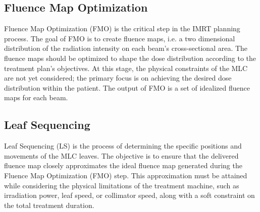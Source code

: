 \subsection[FMO]{Fluence Map Optimization}
Fluence Map Optimization (FMO) is the critical step in the IMRT planning process.
The goal of FMO is to create fluence maps, i.e. a two dimensional distribution of the radiation intensity on each beam's cross-sectional area.
The fluence maps should be optimized to shape the dose distribution according to the treatment plan's objectives.
At this stage, the physical constraints of the MLC are not yet considered; the primary focus is on achieving the desired dose distribution within the patient.
The output of FMO is a set of idealized fluence maps for each beam.

\subsection[LS]{Leaf Sequencing}
Leaf Sequencing (LS) is the process of determining the specific positions and movements of the MLC leaves.
The objective is to ensure that the delivered fluence map closely approximates the ideal fluence map generated during the Fluence Map Optimization (FMO) step.
This approximation must be attained while considering the physical limitations of the treatment machine, such as irradiation power, leaf speed, or collimator speed, along with a soft constraint on the total treatment duration.

